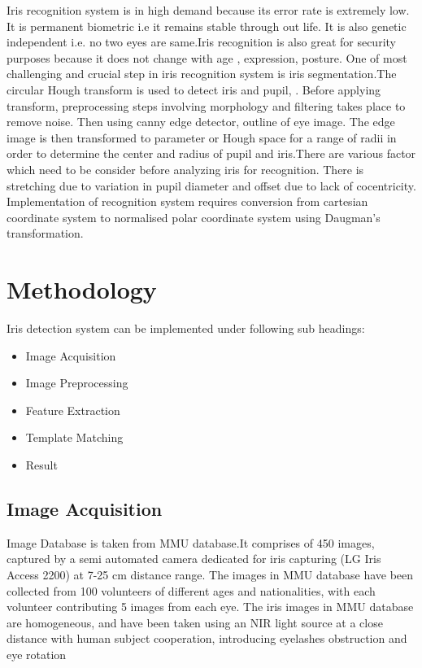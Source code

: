 \documentclass[conference]{Iris_detect}
\begin{document}
Iris recognition system is in high demand because its error rate is extremely low. It is permanent biometric i.e it remains stable through out life. It is also genetic independent i.e. no two eyes are same.Iris recognition is also great for security purposes because it does not change with age , expression, posture.
One of most challenging and crucial step in iris recognition system is iris segmentation.The circular Hough transform is used to detect iris and pupil, . Before applying transform, preprocessing steps involving morphology and filtering takes place to remove noise. Then using canny edge detector, outline of eye image. The edge image is then transformed to parameter or Hough space for a range of radii in order to determine the center and radius of pupil and iris.There are various factor which need to be consider before analyzing iris for recognition. There is stretching due to variation in pupil diameter  and offset due to lack of cocentricity. Implementation of recognition system requires conversion from cartesian coordinate system to normalised polar coordinate system using Daugman's transformation.
\section{Methodology}
Iris detection system can be implemented under following sub headings:
\begin{itemize}
    \item Image Acquisition
    \item Image Preprocessing
    \item Feature Extraction
    \item Template Matching
    \item Result
\end{itemize}


\subsection{Image Acquisition}
Image Database is taken from MMU database\cite{MMU}.It
comprises of 450 images, captured by a semi automated camera dedicated for iris capturing (LG Iris Access 2200) at 7-25 cm distance range. The images in MMU database have been collected from 100 volunteers of different ages and nationalities, with each volunteer contributing 5 images from each eye. The iris images in MMU database are homogeneous, and have been taken using an NIR light source at a close distance with human subject cooperation, introducing eyelashes obstruction and eye rotation  
\end{document}

